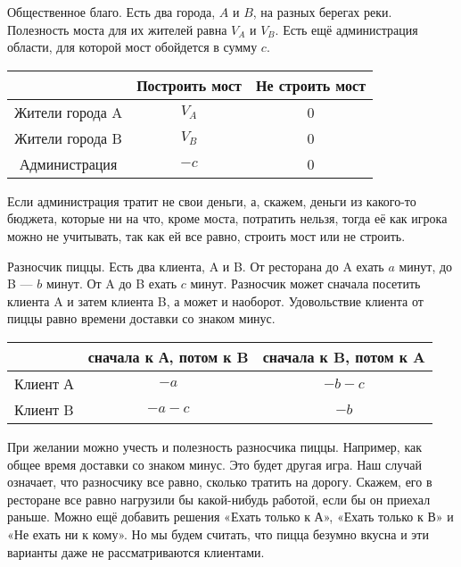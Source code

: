 \begin{myex} \label{bridge}
Общественное благо. Есть два города, $ A $ и $ B $, на разных берегах реки. Полезность моста для их жителей равна $ V_{A} $ и $ V_{B} $. Есть ещё администрация области, для которой мост обойдется в сумму $ c $.


\begin{tabular}{c|cc}
& Построить мост & Не строить мост \\
\hline
Жители города A & $ V_{A} $ & 0 \\
Жители города B & $ V_{B} $ & 0 \\
Администрация & $-c$ & 0 \\
\end{tabular}

Если администрация тратит не свои деньги, а, скажем, деньги из какого-то бюджета, которые ни на что, кроме моста, потратить нельзя, тогда её как игрока можно не учитывать, так как ей все равно, строить мост или не строить.

\end{myex}

\begin{myex} \label{pizza} Разносчик пиццы. Есть два клиента, A и B. От ресторана до A ехать $ a $ минут, до B — $ b $ минут. От A до B ехать $ c $ минут. Разносчик может сначала посетить клиента A и затем клиента B, а может и наоборот. Удовольствие клиента от пиццы равно времени доставки со знаком минус.


\begin{tabular}{c|cc}
& сначала к А, потом к B & сначала к B, потом к A \\
\hline
Клиент А & $-a$ & $-b-c$ \\
Клиент B & $-a-c$ & $-b$ \\
\end{tabular}

При желании можно учесть и полезность разносчика пиццы. Например, как общее время доставки со знаком минус. Это будет другая игра. Наш случай означает, что разносчику все равно, сколько тратить на дорогу. Скажем, его в ресторане все равно нагрузили бы какой-нибудь работой, если бы он приехал раньше. Можно ещё добавить решения «Ехать только к А», «Ехать только к В» и «Не ехать ни к кому». Но мы будем считать, что пицца безумно вкусна и эти варианты даже не рассматриваются клиентами.

\end{myex}


